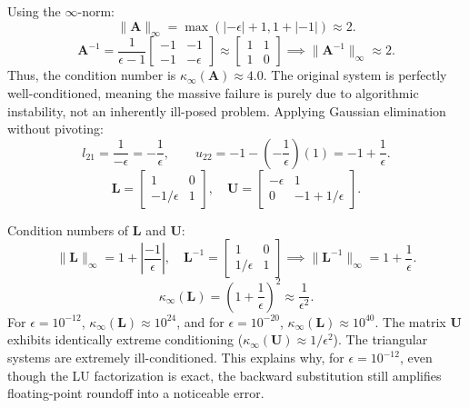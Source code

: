 \begin{solution}
	Using the $\infty$-norm:
	\[
		\|\mathbf{A}\|_\infty = \max(|-\epsilon| + 1, 1 + |-1|) \approx 2.
	\]
	\[
		\mathbf{A}^{-1} = \frac{1}{\epsilon - 1} \begin{bmatrix} -1 & -1 \\ -1 &
		                -\epsilon\end{bmatrix} \approx \begin{bmatrix} 1 & 1 \\ 1 & 0 \end{bmatrix}
		\implies \|\mathbf{A}^{-1}\|_\infty \approx 2.
	\]
	Thus, the condition number is $\kappa_\infty(\mathbf{A}) \approx 4.0$. The
	original system is perfectly well-conditioned, meaning the massive failure is
	purely due to algorithmic instability, not an inherently ill-posed problem.
	Applying Gaussian elimination without pivoting:
	\[
		l_{21} = \frac{1}{-\epsilon} = -\frac{1}{\epsilon}, \qquad u_{22} = -1 -
		\left(-\frac{1}{\epsilon}\right)(1) = -1 + \frac{1}{\epsilon}.
	\]
	\[
		\mathbf{L} = \begin{bmatrix} 1 & 0 \\ -1/\epsilon & 1 \end{bmatrix},
		\quad \mathbf{U} = \begin{bmatrix} -\epsilon & 1 \\ 0 & -1 + 1/\epsilon
		\end{bmatrix}.
	\]

	\item Condition numbers of $\mathbf{L}$ and $\mathbf{U}$:
	\[
		\|\mathbf{L}\|_\infty = 1 + \left| \frac{-1}{\epsilon} \right|, \quad
		\mathbf{L}^{-1} = \begin{bmatrix} 1 & 0 \\ 1/\epsilon & 1 \end{bmatrix} \implies
		\|\mathbf{L}^{-1}\|_\infty = 1 + \frac{1}{\epsilon}.
	\]
	\[
		\kappa_\infty(\mathbf{L}) = \left(1 + \frac{1}{\epsilon}\right)^2
		\approx \frac{1}{\epsilon^2}.
	\]
	For $\epsilon=10^{-12}$, $\kappa_\infty(\mathbf{L}) \approx 10^{24}$, and
	for $\epsilon=10^{-20}$, $\kappa_\infty(\mathbf{L}) \approx 10^{40}$. The matrix
	$\mathbf{U}$ exhibits identically extreme conditioning
	($\kappa_\infty(\mathbf{U}) \approx 1/\epsilon^2$).
	The triangular systems are extremely ill-conditioned. This explains why, for
	$\epsilon=10^{-12}$, even though the LU factorization is exact, the backward
	substitution still amplifies floating-point roundoff into a noticeable error.


\end{solution}
